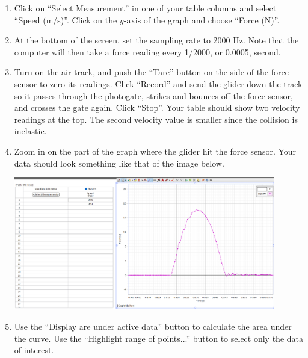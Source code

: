 \begin{enumerate}[label=\arabic*.]
\item Click on ``Select Measurement'' in one of your table columns and select ``Speed (m/s)''.  Click on the \(y\)-axis of the graph and choose ``Force (N)''.

\item At the bottom of the screen, set the sampling rate to 2000 Hz.  Note that the computer will then take a force reading every 1/2000, or 0.0005, second.

\item Turn on the air track, and push the ``Tare'' button on the side of the force sensor to zero its readings.  Click ``Record'' and send the glider down the track so it passes through the photogate, strikes and bounces off the force sensor, and crosses the gate again.  Click ``Stop''.  Your table should show two velocity readings at the top.  The second velocity value is smaller since the collision is inelastic.

\item Zoom in on the part of the graph where the glider hit the force sensor.  Your data should look something like that of the image below.




\begin{center}
\includegraphics*[width=0.9\textwidth]{imgs/6labs/6Alab/6Aexp5/impulse.png}\label{fig:impulse-curve}\end{center}

\item Use the ``Display are under active data'' button to calculate the area under the curve.  Use the ``Highlight range of points...'' button to select only the data of interest.


\end{enumerate}
